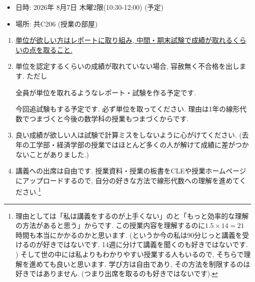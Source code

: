 \documentclass[dvipdfmx,a4paper,11pt]{article} %
\theoremstyle{definition}
\begin{document}
\begin{tcolorbox}[mybox]
\begin{itemize}
  \setlength{\parskip}{0cm} 
  \setlength{\itemsep}{0cm}
\item 日時: 2026年 8月7日 木曜2限(10:30-12:00)  (予定)
\item 場所: 共C206 (授業の部屋)
\end{itemize}
\end{tcolorbox}



\newpage
\medskip
{}
\begin{enumerate}
  \setlength{\parskip}{0cm} 
  \setlength{\itemsep}{0cm} 
\item \underline{単位が欲しい方はレポートに取り組み, 中間・期末試験で成績が取れるくらいの点を取ること.} 
\item 単位を認定するくらいの成績が取れていない場合, 容赦無く不合格を出します. ただし
\begin{tcolorbox}[mybox]
\begin{center}
全員が単位を取れるようなレポート・試験を作る予定です. 
\end{center}
\end{tcolorbox}
今回追試験もする予定です. 必ず単位を取ってください. 理由は1年の線形代数でつまづくと今後の数学科の授業もつまづくからです.  
\item 良い成績が欲しい人は試験で計算ミスをしないように心がけてください. (去年の工学部・経済学部の授業ではほとんど多くの人が解けて成績に差がつかないことがありました.)
\item 講義への出席は自由です. 授業資料・授業の板書をCLEや授業ホームページにアップロードするので, 自分の好きな方法で線形代数への理解を進めてください.\footnote{理由としては「私は講義をするのが上手くない」のと「もっと効率的な理解の方法があると思う」からです. この授業内容を理解するのに$1.5 \times 14 = 21$時間も本当にかかるのかと思います. (というか今の私は90分じっと講義を受けるのが好きではないです.  14週に分けて講義を聞くのも好きではないです. ) そして世の中には私よりもわかりやすい授業する人もいるので, そちらで理解を進めても良いと思います. 学び方は自由であり, その方法を制限するのは好きではありません. (つまり出席を取るのも好きではないです).}
\end{enumerate}
\end{document}
